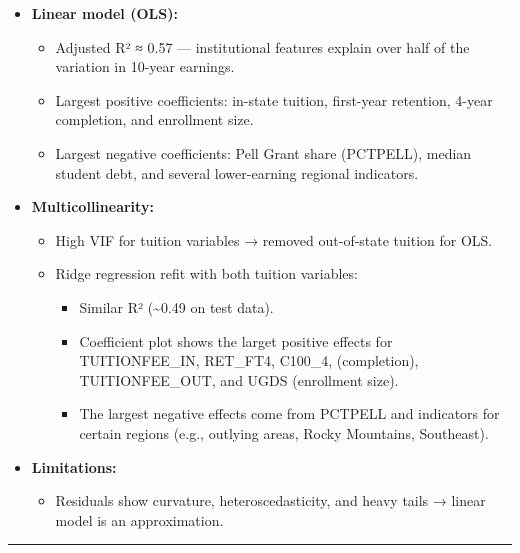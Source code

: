 \documentclass[
  letterpaper,
  DIV=11,
  numbers=noendperiod]{scrartcl}
\providecommand{\tightlist}{%
  \setlength{\itemsep}{0pt}\setlength{\parskip}{0pt}}
\begin{document}
\begin{itemize}
\tightlist
\item
  \textbf{Linear model (OLS):}

  \begin{itemize}
  \tightlist
  \item
    Adjusted R² ≈ 0.57 --- institutional features explain over half of
    the variation in 10-year earnings.
  \item
    Largest positive coefficients: in-state tuition, first-year
    retention, 4-year completion, and enrollment size.
  \item
    Largest negative coefficients: Pell Grant share (PCTPELL), median
    student debt, and several lower-earning regional indicators.
  \end{itemize}
\item
  \textbf{Multicollinearity:}

  \begin{itemize}
  \tightlist
  \item
    High VIF for tuition variables → removed out-of-state tuition for
    OLS.
  \item
    Ridge regression refit with both tuition variables:

    \begin{itemize}
    \tightlist
    \item
      Similar R² (\textasciitilde0.49 on test data).
    \item
      Coefficient plot shows the larget positive effects for
      TUITIONFEE\_IN, RET\_FT4, C100\_4, (completion), TUITIONFEE\_OUT,
      and UGDS (enrollment size).
    \item
      The largest negative effects come from PCTPELL and indicators for
      certain regions (e.g., outlying areas, Rocky Mountains,
      Southeast).
    \end{itemize}
  \end{itemize}
\item
  \textbf{Limitations:}

  \begin{itemize}
  \tightlist
  \item
    Residuals show curvature, heteroscedasticity, and heavy tails →
    linear model is an approximation.
  \end{itemize}
\end{itemize}

\begin{center}\rule{0.5\linewidth}{0.5pt}\end{center}
\end{document}
